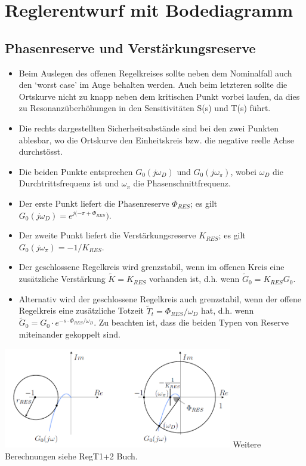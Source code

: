 \section{Reglerentwurf mit Bodediagramm  }

\subsection{Phasenreserve  und Verstärkungsreserve   }
\begin{multicols}{2}
\begin{itemize}
\item Beim Auslegen des offenen Regelkreises sollte neben dem Nominalfall
auch den ‘worst case’ im Auge behalten werden. Auch beim letzteren sollte die
Ortskurve nicht zu knapp neben dem kritischen Punkt vorbei laufen, da dies zu
Resonanzüberhöhungen in den Sensitivitäten S(s) und T(s) führt.
\item Die rechts dargestellten Sicherheitsabstände sind bei den zwei Punkten ablesbar,
wo die Ortskurve den Einheitskreis bzw. die negative reelle Achse durchstösst.
\item Die beiden Punkte entsprechen $G_0(j\omega_D)$ und $G_0(j\omega_{\pi})$, wobei $\omega_D$ die Durchtrittsfrequenz
ist und $\omega_{\pi}$ die Phasenschnittfrequenz.
\item Der erste Punkt liefert die Phasenreserve $\Phi_{RES}$; es gilt $G_0(j\omega_D) = e^{j(-\pi+\Phi_{RES}})$. 
\item Der zweite Punkt liefert die Verstärkungsreserve $K_{RES}$; es gilt $G_0(j\omega_{\pi}) = -1/K_{RES}$. 
\item Der geschlossene Regelkreis wird grenzstabil, wenn im offenen Kreis eine zusätzliche Verstärkung $\widetilde{K} = K_{RES}$ vorhanden ist, d.h. wenn $\widetilde{G}_0 = K_{RES}G_0$.
\item Alternativ wird der geschlossene Regelkreis auch grenzstabil, wenn der offene Regelkreis eine zusätzliche Totzeit $\widetilde{T}_t = \Phi_{RES}/\omega_D$ hat,
d.h. wenn $\widetilde{G}_0 = G_0\cdot e^{-s\cdot\Phi_{RES}/\omega_D}$. Zu beachten ist, dass die beiden Typen von Reserve
miteinander gekoppelt sind.
\end{itemize}
		\includegraphics[width=10cm]{./images/PhasenVerstaerkungReserve.png}
\hspace*{2.5cm}Weitere Berechnungen siehe RegT1+2 Buch.
\end{multicols}
